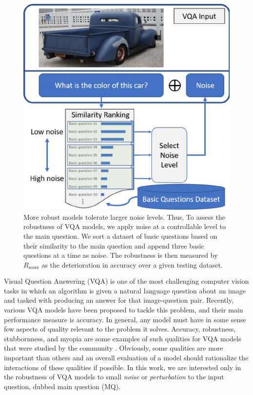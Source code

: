\documentclass[letterpaper]{article}
\newcommand{\rscore}{}\def\rscore/{$R_{\text{score}}$}
\begin{document}
\begin{figure}[t]
	\begin{center}
		\includegraphics{pull_figure}
	\end{center}
	\caption{More robust models tolerate larger noise levels. Thus, To assess the robustness of VQA models, we apply noise at a controllable level to the main question. We sort a dataset of basic questions based on their similarity to the main question and append three basic questions at a time as noise. The robustness is then measured by \rscore/ as the deterioration in accuracy over a given testing dataset.}
	\label{fig:pull_figure}
\end{figure}

Visual Question Answering (VQA) is one of the most challenging computer vision tasks in which an algorithm is given a natural language question about an image and tasked with producing an answer for that image-question pair. Recently, various VQA models \cite{4,9,31,37,41,42,57,58,59} have been proposed to tackle this problem, and their main performance measure is accuracy. In general, any model must have in some sense few aspects of quality relevant to the problem it solves. Accuracy, robustness, stubbornness, and myopia are some examples of such qualities for VQA models that were studied by the community \cite{29}. Obviously, some qualities are more important than others and an overall evaluation of a model should rationalize the interactions of these qualities if possible. In this work, we are interested only in the robustness of VQA models to small \emph{noise} or \emph{perturbation} to the input question, dubbed main question (MQ).
\end{document}
